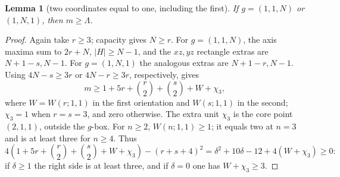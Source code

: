 \documentclass[11pt]{article}
\newtheorem{lemma}[theorem]{Lemma}
\theoremstyle{definition}
\theoremstyle{remark}
\theoremstyle{plain}
\begin{document}
\begin{lemma}[two coordinates equal to one, including the first]\label{res:A12.6}
If $g=(1,1,N)$ or $(1,N,1)$, then $m\ge \Lambda$.
\end{lemma}
\begin{proof}
Again take $r\ge3$; capacity gives $N\ge r$.
For $g=(1,1,N)$, the axis maxima sum to $2r+N$,
$|H|\ge N-1$, and the $xz,yz$ rectangle extras are
$N+1-s,N-1$.  For $g=(1,N,1)$ the analogous extras are
$N+1-r,N-1$.  Using $4N-s\ge3r$ or $4N-r\ge3r$, respectively,
gives
\[
 m\ge1+5r+\binom r2+\binom s2+W+\chi_3,\tag{3.12}\label{eq:capacity-12}
\]
where $W=W(r;1,1)$ in the first orientation and $W(s;1,1)$ in the
second; $\chi_3=1$ when $r=s=3$, and zero otherwise.
The extra unit $\chi_3$ is the core point $(2,1,1)$, outside the $g$-box.
For $n\ge2$, $W(n;1,1)\ge1$; it equals two at $n=3$ and is at least
three for $n\ge4$.  Thus
\[
 4\left(1+5r+\binom r2+\binom s2+W+\chi_3\right)-(r+s+4)^2
 =\delta^2+10\delta-12+4(W+\chi_3)\ge0:
\]
if $\delta\ge1$ the right side is at least three, and if $\delta=0$
one has $W+\chi_3\ge3$. \end{proof}
\end{document}
